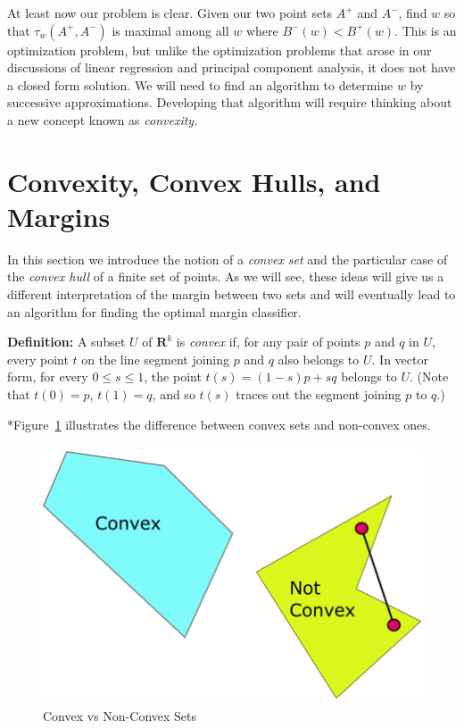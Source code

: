 \documentclass[
  11pt,
  letterpaper,
]{scrbook}
\theoremstyle{plain}
\theoremstyle{plain}
\theoremstyle{remark}
\begin{document}
At least now our problem is clear. Given our two point sets \(A^{+}\)
and \(A^{-}\), find \(w\) so that \(\tau_{w}(A^{+},A^{-})\) is maximal
among all \(w\) where \(B^{-}(w)<B^{+}(w)\). This is an optimization
problem, but unlike the optimization problems that arose in our
discussions of linear regression and principal component analysis, it
does not have a closed form solution. We will need to find an algorithm
to determine \(w\) by successive approximations. Developing that
algorithm will require thinking about a new concept known as
\emph{convexity.}

\hypertarget{convexity-convex-hulls-and-margins}{%
\section{Convexity, Convex Hulls, and
Margins}\label{convexity-convex-hulls-and-margins}}

In this section we introduce the notion of a \emph{convex set} and the
particular case of the \emph{convex hull} of a finite set of points. As
we will see, these ideas will give us a different interpretation of the
margin between two sets and will eventually lead to an algorithm for
finding the optimal margin classifier.

\textbf{Definition:} A subset \(U\) of \(\mathbf{R}^{k}\) is
\emph{convex} if, for any pair of points \(p\) and \(q\) in \(U\), every
point \(t\) on the line segment joining \(p\) and \(q\) also belongs to
\(U\). In vector form, for every \(0\le s\le 1\), the point
\(t(s) = (1-s)p+sq\) belongs to \(U\). (Note that \(t(0)=p\),
\(t(1)=q\), and so \(t(s)\) traces out the segment joining \(p\) to
\(q\).)

*Figure~\ref{fig-convexnotconvex} illustrates the difference between
convex sets and non-convex ones.

\begin{figure}

{\centering \includegraphics[width=\textwidth,height=3in]{chapters/img/ConvexNotConvex.png}

}

\caption{\label{fig-convexnotconvex}Convex vs Non-Convex Sets}

\end{figure}
\end{document}
